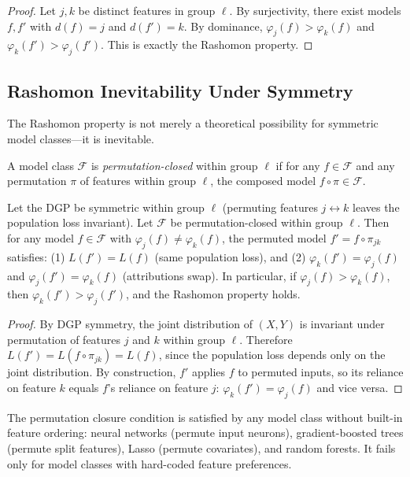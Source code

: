 \documentclass{jmlr}
\begin{document}
\begin{proof}
Let $j, k$ be distinct features in group $\ell$.
By surjectivity, there exist models $f, f'$ with $d(f) = j$ and $d(f') = k$.
By dominance, $\varphi_j(f) > \varphi_k(f)$ and $\varphi_k(f') > \varphi_j(f')$.
This is exactly the Rashomon property.
\end{proof}

\subsection{Rashomon Inevitability Under Symmetry}
\label{sec:rashomon-inevitability}

The Rashomon property is not merely a theoretical possibility for symmetric model classes---it is inevitable.

\begin{definition}
\label{def:perm-closure}
A model class $\mathcal{F}$ is \emph{permutation-closed} within group $\ell$ if for any $f \in \mathcal{F}$ and any permutation $\pi$ of features within group $\ell$, the composed model $f \circ \pi \in \mathcal{F}$.
\end{definition}

\begin{theorem}
\label{thm:rashomon-symmetry}
Let the DGP be symmetric within group $\ell$ (permuting features $j \leftrightarrow k$ leaves the population loss invariant). Let $\mathcal{F}$ be permutation-closed within group $\ell$. Then for any model $f \in \mathcal{F}$ with $\varphi_j(f) \neq \varphi_k(f)$, the permuted model $f' = f \circ \pi_{jk}$ satisfies: (1) $L(f') = L(f)$ (same population loss), and (2) $\varphi_k(f') = \varphi_j(f)$ and $\varphi_j(f') = \varphi_k(f)$ (attributions swap).
In particular, if $\varphi_j(f) > \varphi_k(f)$, then $\varphi_k(f') > \varphi_j(f')$, and the Rashomon property holds.
\end{theorem}

\begin{proof}
By DGP symmetry, the joint distribution of $(X, Y)$ is invariant under permutation of features $j$ and $k$ within group $\ell$. Therefore $L(f') = L(f \circ \pi_{jk}) = L(f)$, since the population loss depends only on the joint distribution. By construction, $f'$ applies $f$ to permuted inputs, so its reliance on feature $k$ equals $f$'s reliance on feature $j$: $\varphi_k(f') = \varphi_j(f)$ and vice versa.
\end{proof}

The permutation closure condition is satisfied by any model class without built-in feature ordering: neural networks (permute input neurons), gradient-boosted trees (permute split features), Lasso (permute covariates), and random forests. It fails only for model classes with hard-coded feature preferences.
\end{document}
